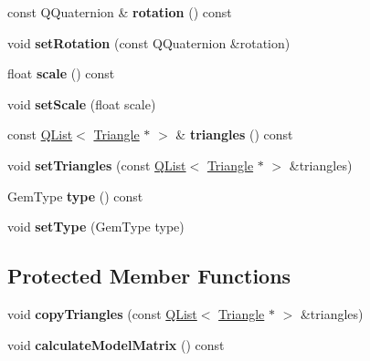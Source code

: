 \begin{DoxyCompactItemize}
\item 
\hypertarget{class_gem_data_a3c902384912903b22d5eaab7e70f1f5c}{}const Q\+Quaternion \& {\bfseries rotation} () const \label{class_gem_data_a3c902384912903b22d5eaab7e70f1f5c}

\item 
\hypertarget{class_gem_data_ac22fb4a6faf13d78299be0f5cfd029a1}{}void {\bfseries set\+Rotation} (const Q\+Quaternion \&rotation)\label{class_gem_data_ac22fb4a6faf13d78299be0f5cfd029a1}

\item 
\hypertarget{class_gem_data_a39ef099801a421c7b7ffbbd920084eb0}{}float {\bfseries scale} () const \label{class_gem_data_a39ef099801a421c7b7ffbbd920084eb0}

\item 
\hypertarget{class_gem_data_a49e18ed27815f66469f4ac951b5f969b}{}void {\bfseries set\+Scale} (float scale)\label{class_gem_data_a49e18ed27815f66469f4ac951b5f969b}

\item 
\hypertarget{class_gem_data_a2c8956630fdf362efe4e69db9bad2f7f}{}const \hyperlink{class_q_list}{Q\+List}$<$ \hyperlink{class_triangle}{Triangle} $\ast$ $>$ \& {\bfseries triangles} () const \label{class_gem_data_a2c8956630fdf362efe4e69db9bad2f7f}

\item 
\hypertarget{class_gem_data_aa4be4b2b96ae412308c89e053249d744}{}void {\bfseries set\+Triangles} (const \hyperlink{class_q_list}{Q\+List}$<$ \hyperlink{class_triangle}{Triangle} $\ast$ $>$ \&triangles)\label{class_gem_data_aa4be4b2b96ae412308c89e053249d744}

\item 
\hypertarget{class_gem_data_a38e33b0c64c37f30d0e063580d6a20bb}{}Gem\+Type {\bfseries type} () const \label{class_gem_data_a38e33b0c64c37f30d0e063580d6a20bb}

\item 
\hypertarget{class_gem_data_a10d94a0bd72a57fb9a52a8f534f3e1dd}{}void {\bfseries set\+Type} (Gem\+Type type)\label{class_gem_data_a10d94a0bd72a57fb9a52a8f534f3e1dd}

\end{DoxyCompactItemize}
\subsection*{Protected Member Functions}
\begin{DoxyCompactItemize}
\item 
\hypertarget{class_gem_data_a24986c8eaaa23640a7cb7fff9f4df2b5}{}void {\bfseries copy\+Triangles} (const \hyperlink{class_q_list}{Q\+List}$<$ \hyperlink{class_triangle}{Triangle} $\ast$ $>$ \&triangles)\label{class_gem_data_a24986c8eaaa23640a7cb7fff9f4df2b5}

\item 
\hypertarget{class_gem_data_ac558e3bbb71c2ec73400f0a0cb309693}{}void {\bfseries calculate\+Model\+Matrix} () const \label{class_gem_data_ac558e3bbb71c2ec73400f0a0cb309693}

\end{DoxyCompactItemize}

